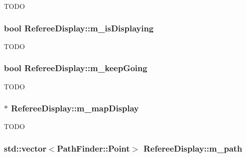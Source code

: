 \label{classRefereeDisplay_a510383c894f917032aadc71f1f31074f}
TODO \hypertarget{classRefereeDisplay_a12bdb098bcf59351f55bc7beb922ac62}{
\subsubsection[{m\_\-isDisplaying}]{\setlength{\rightskip}{0pt plus 5cm}bool {\bf RefereeDisplay::m\_\-isDisplaying}}}
\label{classRefereeDisplay_a12bdb098bcf59351f55bc7beb922ac62}
TODO \hypertarget{classRefereeDisplay_af3bb14682e53eef2d7d9e664f84e6ba1}{
\subsubsection[{m\_\-keepGoing}]{\setlength{\rightskip}{0pt plus 5cm}bool {\bf RefereeDisplay::m\_\-keepGoing}}}
\label{classRefereeDisplay_af3bb14682e53eef2d7d9e664f84e6ba1}
TODO \hypertarget{classRefereeDisplay_a07fda892af04771c6484160fb0e5585f}{
\subsubsection[{m\_\-mapDisplay}]{$\ast$ {\bf RefereeDisplay::m\_\-mapDisplay}}}
\label{classRefereeDisplay_a07fda892af04771c6484160fb0e5585f}
TODO \hypertarget{classRefereeDisplay_a582b6bcc0204a2876b629e8ceebc8abd}{
\subsubsection[{m\_\-path}]{\setlength{\rightskip}{0pt plus 5cm}std::vector$<${\bf PathFinder::Point}$>$ {\bf RefereeDisplay::m\_\-path}}}
